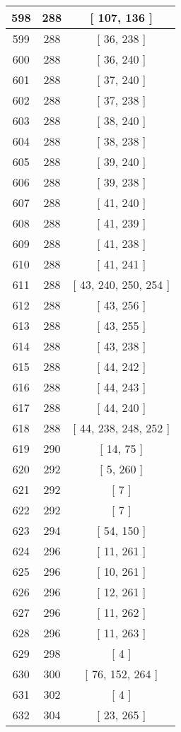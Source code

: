 \begin{center}
\begin{longtable}[H]{|| c c c ||}
\hline
598 & 288 & [ 107, 136 ] \\ 
\hline
599 & 288 & [ 36, 238 ] \\ 
\hline
600 & 288 & [ 36, 240 ] \\ 
\hline
601 & 288 & [ 37, 240 ] \\ 
\hline
602 & 288 & [ 37, 238 ] \\ 
\hline
603 & 288 & [ 38, 240 ] \\ 
\hline
604 & 288 & [ 38, 238 ] \\ 
\hline
605 & 288 & [ 39, 240 ] \\ 
\hline
606 & 288 & [ 39, 238 ] \\ 
\hline
607 & 288 & [ 41, 240 ] \\ 
\hline
608 & 288 & [ 41, 239 ] \\ 
\hline
609 & 288 & [ 41, 238 ] \\ 
\hline
610 & 288 & [ 41, 241 ] \\ 
\hline
611 & 288 & [ 43, 240, 250, 254 ] \\ 
\hline
612 & 288 & [ 43, 256 ] \\ 
\hline
613 & 288 & [ 43, 255 ] \\ 
\hline
614 & 288 & [ 43, 238 ] \\ 
\hline
615 & 288 & [ 44, 242 ] \\ 
\hline
616 & 288 & [ 44, 243 ] \\ 
\hline
617 & 288 & [ 44, 240 ] \\ 
\hline
618 & 288 & [ 44, 238, 248, 252 ] \\ 
\hline
619 & 290 & [ 14, 75 ] \\ 
\hline
620 & 292 & [ 5, 260 ] \\ 
\hline
621 & 292 & [ 7 ] \\ 
\hline
622 & 292 & [ 7 ] \\ 
\hline
623 & 294 & [ 54, 150 ] \\ 
\hline
624 & 296 & [ 11, 261 ] \\ 
\hline
625 & 296 & [ 10, 261 ] \\ 
\hline
626 & 296 & [ 12, 261 ] \\ 
\hline
627 & 296 & [ 11, 262 ] \\ 
\hline
628 & 296 & [ 11, 263 ] \\ 
\hline
629 & 298 & [ 4 ] \\ 
\hline
630 & 300 & [ 76, 152, 264 ] \\ 
\hline
631 & 302 & [ 4 ] \\ 
\hline
632 & 304 & [ 23, 265 ] \\ 

\end{longtable}
\end{center}
